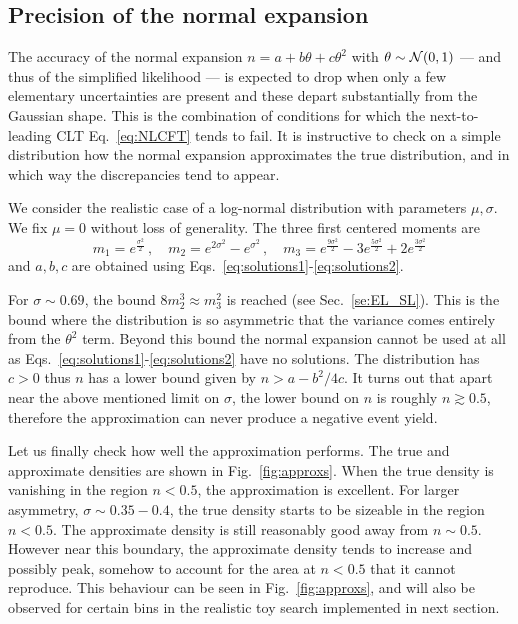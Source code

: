 \documentclass[11pt]{article}
\newcommand{\be}{\begin{equation}}
\newcommand{\ee}{\end{equation}}
\begin{document}
\subsection{Precision of the normal expansion}

The accuracy of the normal expansion $n =  a+ b \theta+ c \theta^2$ with $\theta\sim {\cal N}(0,1)$ --- and thus of the  simplified likelihood --- is expected to drop when only a few elementary  uncertainties are present and these depart substantially from the Gaussian shape. This is the combination of conditions for which the
 next-to-leading CLT Eq.~\eqref{eq:NLCFT} tends to fail.  It is instructive to check  on a simple distribution how the normal expansion  approximates the true distribution, and in which way the discrepancies tend to appear.

We consider the realistic  case of     a log-normal distribution with parameters $\mu, \sigma$. We fix $\mu=0$ without loss of generality. The three first centered moments are
\be
m_1=e^{\frac{\sigma^2}{2}}\,,\quad m_2=e^{2\sigma^2}-e^{\sigma^2}\,,\quad
m_3=e^{\frac{9\sigma^2}{2}}-3 e^{\frac{5\sigma^2}{2}}+2 e^{\frac{3\sigma^2}{2}}
\ee
and  $a,b,c$ are obtained  using  Eqs.~\eqref{eq:solutions1}-\eqref{eq:solutions2}.

For $\sigma\sim 0.69$, the bound $8m_2^3\approx m_3^2$  is reached (see Sec.~\ref{se:EL_SL}). This is the bound where
the distribution is so asymmetric that the variance comes entirely from the $\theta^2$ term. Beyond this bound the  normal expansion cannot be used at all as Eqs.~\eqref{eq:solutions1}-\eqref{eq:solutions2} have no solutions.
 The distribution has $c>0$ thus $n$ has a lower bound given by $n>a-b^2/4c$. It turns out that apart near the above mentioned limit on $\sigma$, the lower bound on $n$ is roughly $n\gtrsim 0.5$, therefore the approximation can never produce a negative event yield.

 Let us finally check how well the approximation performs. The true and approximate densities are shown in Fig.~\ref{fig:approxs}.   When the true density is vanishing in the region $n<0.5$, the approximation is excellent.  For larger asymmetry, $\sigma \sim 0.35-0.4$, the true density starts to be sizeable in the region $n<0.5$. The approximate density is still reasonably good away from $n\sim 0.5$. However near this boundary, the approximate density tends to increase and possibly peak, somehow to account for  the area at $n<0.5$ that it cannot reproduce.
 This behaviour can be seen in Fig.~\ref{fig:approxs}, and will also be observed for certain bins in the realistic toy search implemented in next section.
\end{document}
